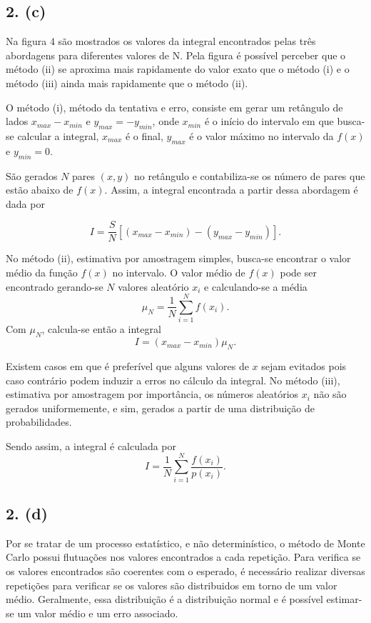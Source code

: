 \documentclass[brazilian, 12pt, a4paper, final]{article}
\begin{document}
\subsection*{2. (c)}
Na figura 4 são mostrados os valores da integral encontrados pelas três abordagens para diferentes valores de N. Pela figura é possível perceber que o método (ii) se aproxima mais rapidamente do valor exato que o método (i) e o método (iii) ainda mais rapidamente que o método (ii).

O método (i), método da tentativa e erro, consiste em gerar um retângulo de lados $x_{max}-x_{min}$ e $y_{max}=-y_{min}$, onde $x_{min}$ é o início do intervalo em que busca-se calcular a integral, $x_{max}$ é o final, $y_{max}$ é o valor máximo no intervalo  da $f(x)$ e $y_{min}=0$. 

São gerados $N$ pares $(x,y)$ no retângulo e contabiliza-se os número de pares que estão abaixo de $f(x)$. Assim, a integral encontrada a partir dessa abordagem é dada por

\begin{equation}
	I=\frac{S}{N}[(x_{max}-x_{min})-(y_{max}-y_{min})].
\end{equation}

No método (ii), estimativa por amostragem simples, busca-se encontrar o valor médio da função $f(x)$ no intervalo. O valor médio de $f(x)$ pode ser encontrado gerando-se $N$ valores aleatório $x_i$ e calculando-se a média
\begin{equation}
	\mu_N=\frac{1}{N}\sum_{i=1}^{N}f(x_i). 
\end{equation}
Com $\mu_N$, calcula-se então a integral 
\begin{equation}
	I=(x_{max}-x_{min})\mu_N.
\end{equation}

Existem casos em que é preferível que alguns valores de $x$ sejam evitados pois caso contrário podem induzir a erros no cálculo da integral. No método (iii), estimativa por amostragem por importância, os números aleatórios $x_i$ não são gerados uniformemente, e sim, gerados a partir de uma distribuição de probabilidades. 

Sendo assim, a  integral é calculada por
\begin{equation}
	I=\frac{1}{N}\sum_{i=1}^{N}\frac{f(x_i)}{p(x_i)}.
\end{equation}
 
\subsection*{2. (d)}
Por se tratar de um processo estatístico, e não determinístico, o método de Monte Carlo possui flutuações nos valores encontrados a cada repetição. Para verifica se os valores encontrados são coerentes com o esperado, é necessário realizar diversas repetições para verificar se os valores são distribuidos em torno de um valor médio. Geralmente, essa distribuição é a distribuição normal e é possível estimar-se um valor médio e um erro associado.
\end{document}
